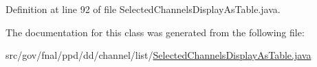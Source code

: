 Definition at line 92 of file Selected\-Channels\-Display\-As\-Table.\-java.



The documentation for this class was generated from the following file\-:\begin{DoxyCompactItemize}
\item 
src/gov/fnal/ppd/dd/channel/list/\hyperlink{SelectedChannelsDisplayAsTable_8java}{Selected\-Channels\-Display\-As\-Table.\-java}\end{DoxyCompactItemize}
